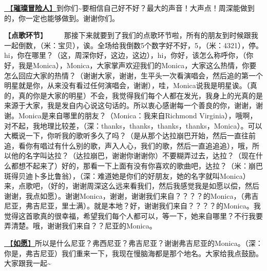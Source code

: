 \documentclass[]{ctexbook}
\begin{document}
\hyperref[adventurers]{🎵【\textbf{璀璨冒险人}】}到你们\textasciitilde 要相信自己好不好？最大的声音！大声点！周深能做到的，你一定也能够做到。谢谢你们。

【\textbf{点歌环节}】
  那接下来就要到了我们的点歌环节啦，所有的朋友到时候跟我一起倒数，（米：宝贝），诶。全场给我倒数5个数字好不好，5，（米：4321），停。hi，你在哪里？（这，周深你好，这边，这边），hi，你好，该怎么称呼你，（你好，我是Monica），Monica，大家掌声欢迎我们的Monica，大家这么热情，你要怎么回应大家的热情？（谢谢大家，谢谢，生平头一次看演唱会，然后追的第一个明星就是你，从来没有看过任何演唱会，谢谢），哇，Monica说我是明星诶。（真的，真的你是大家的明星）不会，我觉得我们每个人都在发光，我身上的光真的是来源于大家，我是发自内心说这句话的。所以衷心感谢每一个善良的你，谢谢，谢谢。Monica是来自哪里的朋友？（Monica：我来自Richmond Virginia），哦啊，对不起，我地理比较差，（深：thanks，thanks，thanks，thanks，Monica）。可以大概说一下，你听我的歌听多久了吗？（是从那个达拉崩巴开始，然后一直往前追，看你有唱过有什么别的歌，声入人心，我们的歌，然后一直追追追），哦，所以他的名字叫达拉？（达拉崩巴，谢谢你谢谢你）不要糊弄过去，达拉？（现在什么都想不起来了）好的，那看一下上面有没有你喜欢的歌曲吧，达拉？（米：崩巴斑得贝迪卜多比鲁翁），（深：难道她是你们的好朋友，她的名字就叫Monica）来，点歌吧，（好的，谢谢周深这么远来看我们，然后我感觉我是如愿以偿，然后谢谢，我点如愿）。谢谢Monica，谢谢，谢谢我们来自？？？？的Monica，（弗吉尼亚，弗吉尼亚，里士满）。就是本地？好，谢谢我们来自？？？？的Monica。我觉得这首歌真的很幸福，希望我们每个人都可以，等一下，她来自哪里？不行我要弄清楚。哦，谢谢我们来自？？尼亚的Monica。

\hyperref[As-you-wish]{🎵【\textbf{如愿}】}所以是什么尼亚？弗西尼亚？弗吉尼亚？谢谢弗吉尼亚的Monica。（深：你是，弗吉尼亚）我们重来一下，我现在慢脑海都是那个地名。大家给我点鼓励。大家跟我一起\textasciitilde{}
\end{document}
